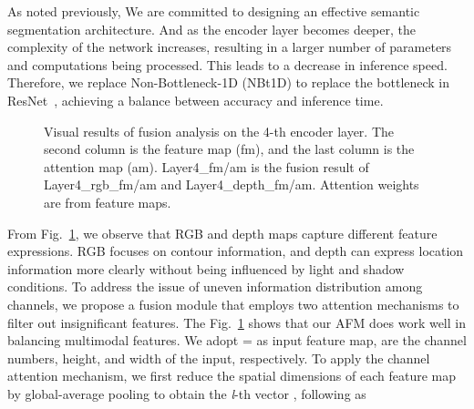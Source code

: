 \documentclass[journal,twoside,web]{ieeecolor}
\begin{document}
As noted previously, We are committed to designing an effective semantic segmentation architecture.  And as the encoder layer becomes deeper, the complexity of the network increases, resulting in a larger number of parameters and computations being processed. This leads to a decrease in inference speed. Therefore, we replace Non-Bottleneck-1D (NBt1D) to replace the bottleneck in ResNet~\cite{EMSANet}, achieving a balance between accuracy and inference time.
\begin{figure}[!t]
	\centering
{}\hspace{-0.8em}
	\hspace{-0.8em}
	\hspace{-0.8em}
	\hspace{-0.8em}
	\hspace{-0.8em}
	\hspace{-0.8em}
	\hspace{-0.8em}
	\hspace{-0.8em}	
	\caption{Visual results of fusion analysis on the 4-th encoder layer. The second column is the feature map (fm), and the last column is the attention map (am). Layer4\_fm/am is the fusion result of Layer4\_rgb\_fm/am and Layer4\_depth\_fm/am. Attention weights are from feature maps.}
	\label{fig:attention}
\end{figure}

From Fig.~\ref{fig:attention}, we observe that RGB and depth maps capture different feature expressions. RGB focuses on contour information, and depth can express location information more clearly without being influenced by light and shadow conditions. To address the issue of uneven information distribution among channels, we propose a fusion module that employs two attention mechanisms to filter out insignificant features. The Fig.~\ref{fig:attention} shows that our AFM does work well in balancing multimodal features.
We adopt  =    as input feature map,  are the channel numbers, height, and width of the input, respectively.
To apply the channel attention mechanism, we first reduce the spatial dimensions of each feature map by global-average pooling to obtain the \textit{l}-th vector   , following as
 
\end{document}
